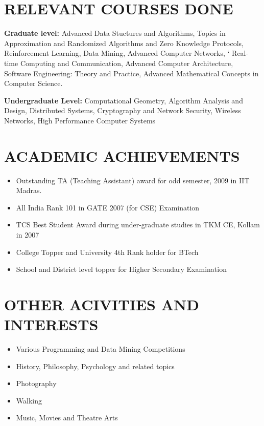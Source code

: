 \documentclass{res}
\begin{document}
\begin{resume}
\section{RELEVANT COURSES DONE}

\textbf{Graduate level:} 
Advanced Data Stuctures and Algorithms, 
Topics in Approximation and Randomized Algorithms and Zero Knowledge Protocols, 
Reinforcement Learning, 
Data Mining, 
Advanced Computer Networks, `
Real-time Computing and Communication, 
Advanced Computer Architecture, 
Software Engineering: Theory and Practice, 
Advanced Mathematical Concepts in Computer Science.

\textbf{Undergraduate Level:}
Computational Geometry, 
Algorithm Analysis and Design, 
Distributed Systems, 
Cryptography and Network Security, 
Wireless Networks, 
High Performance Computer Systems

\section{ACADEMIC ACHIEVEMENTS}          
\begin{itemize}
\item Outstanding TA (Teaching Assistant) award for odd semester, 2009 in IIT Madras.
\item All India Rank 101 in GATE 2007 (for CSE) Examination
\item TCS Best Student Award during under-graduate studies in TKM CE, Kollam in 2007
\item College Topper and University 4th Rank holder for BTech
\item School and District level topper for Higher Secondary Examination

\end{itemize}

\section{OTHER ACIVITIES AND INTERESTS}

\begin{itemize}
\item Various Programming and Data Mining Competitions
\item History, Philosophy, Psychology and related topics
\item Photography
\item Walking
\item Music, Movies and Theatre Arts

\end{itemize} 
\end{resume}
\end{document}
